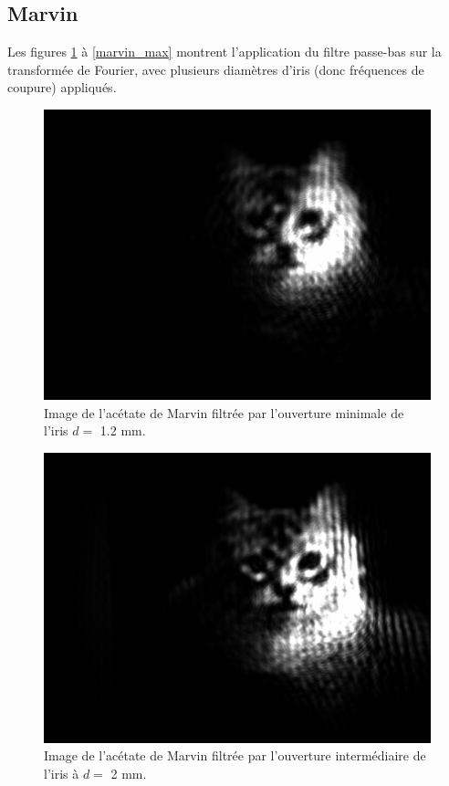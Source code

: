 \documentclass[11pt,letterpaper]{article}
\begin{document}
\subsection{Marvin}

Les figures \ref{marvin_min} à \ref{marvin_max} montrent l'application du filtre passe-bas sur la transformée de
Fourier, avec plusieurs diamètres d'iris (donc fréquences de coupure) appliqués.

\begin{figure}[H]
  \centering
  \includegraphics[scale=0.28]{marvin_min.png}
  \caption{Image de l'acétate de Marvin filtrée par l'ouverture minimale de l'iris $d =$ 1.2 mm.}
  \label{marvin_min}
\end{figure}

\begin{figure}[H]
  \centering
  \includegraphics[scale=0.28]{marvin_partiel_d2.png}
  \caption{Image de l'acétate de Marvin filtrée par l'ouverture intermédiaire de l'iris à $d =$ 2 mm.}
  \label{marvin_mid}
\end{figure}
\end{document}
